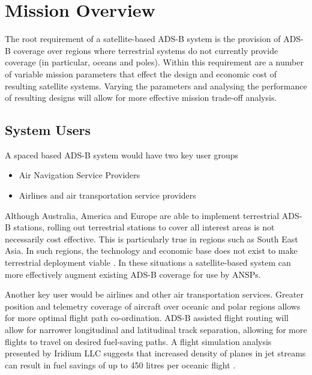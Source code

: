 \section{Mission Overview}
The root requirement of a satellite-based ADS-B system is the provision of ADS-B coverage over regions where terrestrial systems do not currently provide coverage (in particular, oceans and poles). Within this requirement are a number of variable mission parameters that effect the design and economic cost of resulting satellite systems. Varying the parameters and analysing the performance of resulting designs will allow for more effective mission trade-off analysis.

\subsection{System Users}
A spaced based ADS-B system would have two key user groups
\begin{itemize}
	\item Air Navigation Service Providers
	\item Airlines and air transportation service providers
\end{itemize}
Although Australia, America and Europe are able to implement terrestrial ADS-B stations, rolling out terrestrial stations to cover all interest areas is not necessarily cost effective. This is particularly true in regions such as South East Asia. In such regions, the technology and economic base does not exist to make terrestrial deployment viable \cite{Blomenhofer2012}. In these situations a satellite-based system can more effectively augment existing ADS-B coverage for use by ANSPs.

Another key user would be airlines and other air transportation services. Greater position and telemetry coverage of aircraft over oceanic and polar regions allows for more optimal flight path co-ordination. ADS-B assisted flight routing will allow for narrower longitudinal and latitudinal track separation, allowing for more flights to travel on desired fuel-saving paths. A flight simulation analysis presented by Iridium LLC suggests that increased density of planes in jet streams can result in fuel savings of up to 450 litres per oceanic flight \cite{Dawson2013}. 


